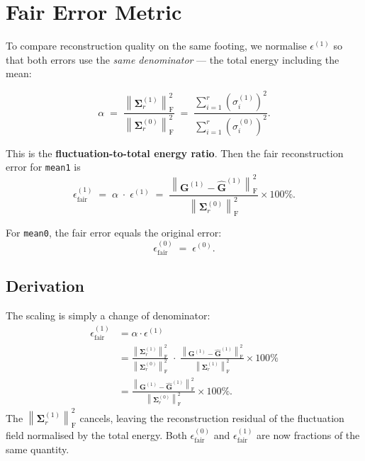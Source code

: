 \documentclass[11pt,a4paper]{article}
\newcommand{\norm}[1]{\left\lVert #1 \right\rVert}
\newcommand{\Fro}{\mathrm{F}}
\newcommand{\Sigmat}{\bm{\Sigma}}
\begin{document}
\section{Fair Error Metric}
\label{sec:fair}

To compare reconstruction quality on the same footing, we normalise $\epsilon^{(1)}$ so that both errors use the \emph{same denominator} — the total energy including the mean:

\begin{equation}\label{eq:alpha}
\alpha \;=\; \frac{\norm{\Sigmat_r^{(1)}}_\Fro^2}{\norm{\Sigmat_r^{(0)}}_\Fro^2}
\;=\; \frac{\sum_{i=1}^{r} \left(\sigma_i^{(1)}\right)^2}{\sum_{i=1}^{r} \left(\sigma_i^{(0)}\right)^2}.
\end{equation}

This is the \textbf{fluctuation-to-total energy ratio}.  Then the fair reconstruction error for \texttt{mean1} is
\begin{equation}\label{eq:fair}
\boxed{\epsilon_{\mathrm{fair}}^{(1)} \;=\; \alpha \;\cdot\; \epsilon^{(1)} \;=\; \frac{\norm{\bm{G}^{(1)} - \hat{\bm{G}}^{(1)}}_\Fro^2}{\norm{\Sigmat_r^{(0)}}_\Fro^2} \times 100\%.}
\end{equation}

For \texttt{mean0}, the fair error equals the original error:
\begin{equation}
\epsilon_{\mathrm{fair}}^{(0)} \;=\; \epsilon^{(0)}.
\end{equation}

\subsection{Derivation}

The scaling is simply a change of denominator:
\begin{align}
\epsilon_{\mathrm{fair}}^{(1)} 
&= \alpha \cdot \epsilon^{(1)} \nonumber\\
&= \frac{\norm{\Sigmat_r^{(1)}}_\Fro^2}{\norm{\Sigmat_r^{(0)}}_\Fro^2} \;\cdot\;
   \frac{\norm{\bm{G}^{(1)} - \hat{\bm{G}}^{(1)}}_\Fro^2}{\norm{\Sigmat_r^{(1)}}_\Fro^2} \times 100\% \nonumber\\
&= \frac{\norm{\bm{G}^{(1)} - \hat{\bm{G}}^{(1)}}_\Fro^2}{\norm{\Sigmat_r^{(0)}}_\Fro^2} \times 100\%.
\end{align}
The $\norm{\Sigmat_r^{(1)}}_\Fro^2$ cancels, leaving the reconstruction residual of the fluctuation field normalised by the total energy.  Both $\epsilon_{\mathrm{fair}}^{(0)}$ and $\epsilon_{\mathrm{fair}}^{(1)}$ are now fractions of the same quantity.
\end{document}
